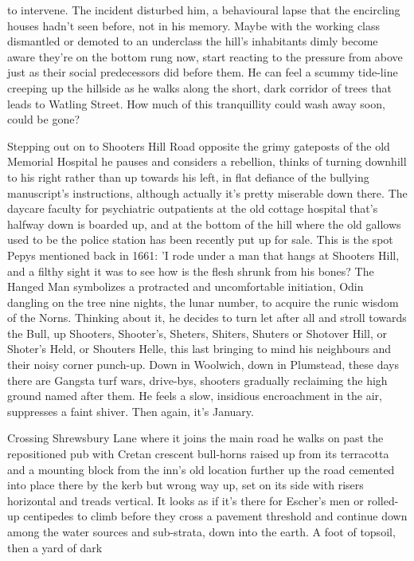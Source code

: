 \documentclass[
]{article}
\begin{document}
to intervene. The incident disturbed him, a behavioural lapse that the
encircling houses hadn't seen before, not in his memory. Maybe with the
working class dismantled or demoted to an underclass the hill's
inhabitants dimly become aware they're on the bottom rung now, start
reacting to the pressure from above just as their social predecessors
did before them. He can feel a scummy tide-line creeping up the hillside
as he walks along the short, dark corridor of trees that leads to
Watling Street. How much of this tranquillity could wash away soon,
could be gone? \par
Stepping out on to Shooters Hill Road opposite the grimy gateposts
of the old Memorial Hospital he pauses and considers a rebellion, thinks
of turning downhill to his right rather than up towards his left, in
flat defiance of the bullying manuscript's instructions, although
actually it's pretty miserable down there. The daycare faculty for
psychiatric outpatients at the old cottage hospital that's halfway down
is boarded up, and at the bottom of the hill where the old gallows used
to be the police station has been recently put up for sale. This is the
spot Pepys mentioned back in 1661: 'I rode under a man that hangs at
Shooters Hill, and a filthy sight it was to see how is the flesh shrunk
from his bones? The Hanged Man symbolizes a protracted and uncomfortable
initiation, Odin dangling on the tree nine nights, the lunar number, to
acquire the runic wisdom of the Norns. Thinking about it, he decides to
turn let after all and stroll towards the Bull, up Shooters, Shooter's,
Sheters, Shiters, Shuters or Shotover Hill, or Shoter's Held, or
Shouters Helle, this last bringing to mind his neighbours and their
noisy corner punch-up. Down in Woolwich, down in Plumstead, these days
there are Gangsta turf wars, drive-bys, shooters gradually reclaiming
the high ground named after them. He feels a slow, insidious
encroachment in the air, suppresses a faint shiver. Then again, it's
January. \par
Crossing Shrewsbury Lane where it joins the main road he walks on
past the repositioned pub with Cretan crescent bull-horns raised up from
its terracotta and a mounting block from the inn's old location further
up the road cemented into place there by the kerb but wrong way up, set
on its side with risers horizontal and treads vertical. It looks as if
it's there for Escher's men or rolled-up centipedes to climb before they
cross a pavement threshold and continue down among the water sources and
sub-strata, down into the earth. A foot of topsoil, then a yard of dark
\end{document}
